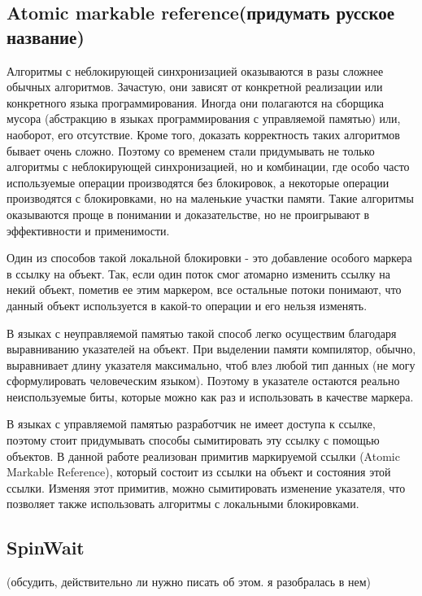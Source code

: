 \documentclass[12pt]{article}
\begin{document}
{			\subsection{Atomic markable reference(придумать русское название)}
				\par Алгоритмы с неблокирующей синхронизацией оказываются в разы сложнее обычных алгоритмов. Зачастую, они зависят от конкретной реализации или конкретного языка программирования. Иногда они полагаются на сборщика мусора (абстракцию в языках программирования с управляемой памятью) или, наоборот, его отсутствие. Кроме того, доказать корректность таких алгоритмов бывает очень сложно. Поэтому со временем стали придумывать не только алгоритмы с неблокирующей синхронизацией, но и комбинации, где особо часто используемые операции производятся без блокировок, а некоторые операции производятся с блокировками, но на маленькие участки памяти. Такие алгоритмы оказываются проще в понимании и доказательстве, но не проигрывают в эффективности и применимости.  
				\par Один из способов такой локальной блокировки - это добавление особого маркера в ссылку на объект. Так, если один поток смог атомарно изменить ссылку на некий объект, пометив ее этим маркером, все остальные потоки понимают, что данный объект используется в какой-то операции и его нельзя изменять. 
				\par В языках с неуправляемой памятью такой способ легко осуществим благодаря выравниванию указателей на объект. При выделении памяти компилятор, обычно, выравнивает длину указателя максимально, чтоб влез любой тип данных (не могу сформулировать человеческим языком). Поэтому в указателе остаются реально неиспользуемые биты, которые можно как раз и использовать в качестве маркера.
				\par В языках с управляемой памятью разработчик не имеет доступа к ссылке, поэтому стоит придумывать способы сымитировать эту ссылку с помощью объектов. В данной работе реализован примитив маркируемой ссылки (Atomic Markable Reference), который состоит из ссылки на объект и состояния этой ссылки. Изменяя этот примитив, можно сымитировать изменение указателя, что позволяет также использовать алгоритмы с локальными блокировками.			
			\subsection{SpinWait}
				\par (обсудить, действительно ли нужно писать об этом. я разобралась в нем)
		
}
\end{document}
